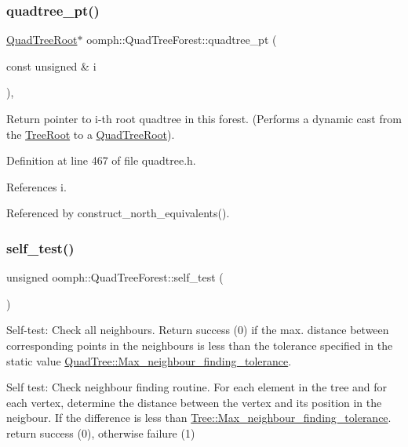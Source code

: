 \subsubsection{\texorpdfstring{quadtree\+\_\+pt()}{quadtree\_pt()}}
{\footnotesize\ttfamily \hyperlink{classoomph_1_1QuadTreeRoot}{Quad\+Tree\+Root}$\ast$ oomph\+::\+Quad\+Tree\+Forest\+::quadtree\+\_\+pt (\begin{DoxyParamCaption}\item[{const unsigned \&}]{i }\end{DoxyParamCaption})\hspace{0.3cm}{\ttfamily [inline]}, {\ttfamily [private]}}

Return pointer to i-\/th root quadtree in this forest. (Performs a dynamic cast from the \hyperlink{classoomph_1_1TreeRoot}{Tree\+Root} to a \hyperlink{classoomph_1_1QuadTreeRoot}{Quad\+Tree\+Root}). 

Definition at line 467 of file quadtree.\+h.



References i.



Referenced by construct\+\_\+north\+\_\+equivalents().

\mbox{\label{classoomph_1_1QuadTreeForest_a8b5f84f7d478ba7f9d66804c8f7b5783}} 
\subsubsection{\texorpdfstring{self\+\_\+test()}{self\_test()}}
{\footnotesize\ttfamily unsigned oomph\+::\+Quad\+Tree\+Forest\+::self\+\_\+test (\begin{DoxyParamCaption}{ }\end{DoxyParamCaption})}



Self-\/test\+: Check all neighbours. Return success (0) if the max. distance between corresponding points in the neighbours is less than the tolerance specified in the static value \hyperlink{classoomph_1_1Tree_aef9abebc166fa3bf81ecb59ec0d5d6b2}{Quad\+Tree\+::\+Max\+\_\+neighbour\+\_\+finding\+\_\+tolerance}. 

Self test\+: Check neighbour finding routine. For each element in the tree and for each vertex, determine the distance between the vertex and its position in the neigbour. If the difference is less than \hyperlink{classoomph_1_1Tree_aef9abebc166fa3bf81ecb59ec0d5d6b2}{Tree\+::\+Max\+\_\+neighbour\+\_\+finding\+\_\+tolerance}. return success (0), otherwise failure (1) 

